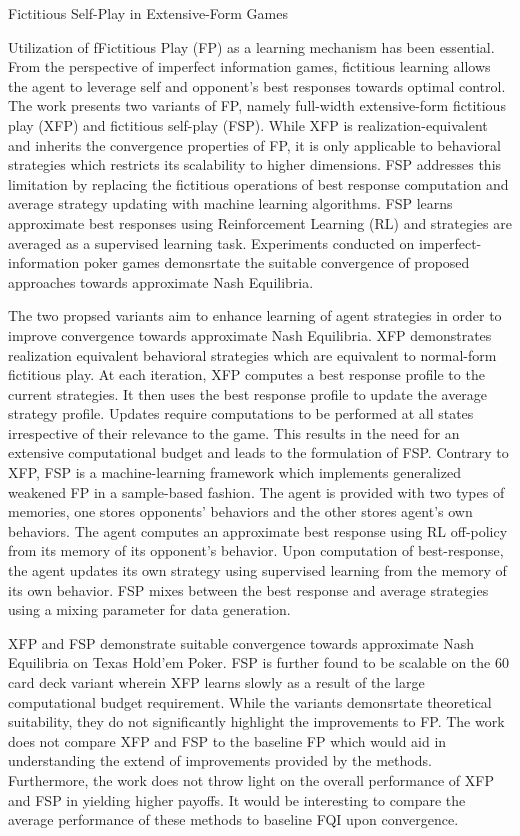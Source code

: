 \documentclass[11pt,letterpaper]{article}
\begin{document}
\begin{center}
  \large{Fictitious Self-Play in Extensive-Form Games}
\end{center}
Utilization of fFictitious Play (FP) as a learning mechanism has been essential. From the perspective of imperfect information games, fictitious learning allows the agent to leverage self and opponent's best responses towards optimal control. The work presents two variants of FP, namely full-width extensive-form fictitious play (XFP) and fictitious self-play (FSP). While XFP is realization-equivalent and inherits the convergence properties of FP, it is only applicable to behavioral strategies which restricts its scalability to higher dimensions. FSP addresses this limitation by replacing the fictitious operations of best response computation and average strategy updating with machine learning algorithms. FSP learns approximate best responses using Reinforcement Learning (RL) and strategies are averaged as a supervised learning task. Experiments conducted on imperfect-information poker games demonsrtate the suitable convergence of proposed approaches towards approximate Nash Equilibria. 

The two propsed variants aim to enhance learning of agent strategies in order to improve convergence towards approximate Nash Equilibria. XFP demonstrates realization equivalent behavioral strategies which are equivalent to normal-form fictitious play. At each iteration, XFP computes a best response profile to the current strategies. It then uses the best response profile to update the average strategy profile. Updates require computations to be performed at all states irrespective of their relevance to the game. This results in the need for an extensive computational budget and leads to the formulation of FSP. Contrary to XFP, FSP is a machine-learning framework which implements generalized weakened FP in a sample-based fashion. The agent is provided with two types of memories, one stores opponents' behaviors and the other stores agent's own behaviors. The agent computes an approximate best response using RL off-policy from its memory of its opponent's behavior. Upon computation of best-response, the agent updates its own strategy using supervised learning from the memory of its own behavior. FSP mixes between the best response and average strategies using a mixing parameter for data generation. 

XFP and FSP demonstrate suitable convergence towards approximate Nash Equilibria on Texas Hold'em Poker. FSP is further found to be scalable on the 60 card deck variant wherein XFP learns slowly as a result of the large computational budget requirement. While the variants demonsrtate theoretical suitability, they do not significantly highlight the improvements to FP. The work does not compare XFP and FSP to the baseline FP which would aid in understanding the extend of improvements provided by the methods. Furthermore, the work does not throw light on the overall performance of XFP and FSP in yielding higher payoffs. It would be interesting to compare the average performance of these methods to baseline FQI upon convergence.
\end{document}

